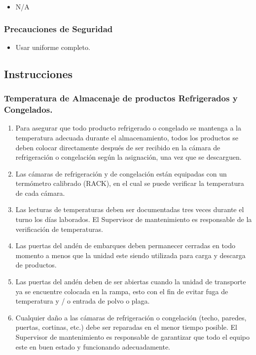 \begin{itemize}
	\item N/A
\end{itemize}

\subsubsection{Precauciones de Seguridad}

\begin{itemize}
	\item Usar uniforme completo.
\end{itemize}

\subsection{Instrucciones}

\subsubsection{Temperatura de Almacenaje de productos Refrigerados y Congelados.}

\begin{enumerate}
	\item Para asegurar que todo producto refrigerado o congelado se mantenga a la temperatura adecuada durante el almacenamiento, todos los productos se deben colocar directamente después de ser recibido en la cámara de refrigeración o congelación según la asignación, una vez que se descarguen.
	\item Las cámaras de refrigeración y de congelación están equipadas con un termómetro calibrado (RACK), en el cual se puede verificar la temperatura de cada cámara.
	\item Las lecturas de temperaturas deben ser documentadas tres veces durante el turno los días laborados. El Supervisor de mantenimiento es responsable de la verificación de temperaturas.
	\item Las puertas del andén de embarques deben permanecer cerradas en todo momento a menos que la unidad este siendo utilizada para carga y descarga de productos.
	\item Las puertas del andén deben de ser abiertas cuando la unidad de transporte ya se encuentre colocada en la rampa, esto con el fin de evitar fuga de temperatura y / o entrada de polvo o plaga.
	\item Cualquier daño a las cámaras de refrigeración o congelación (techo, paredes, puertas, cortinas, etc.) debe ser reparadas en el menor tiempo posible. El Supervisor de mantenimiento es responsable de garantizar que todo el equipo este en buen estado y funcionando adecuadamente.
\end{enumerate}

